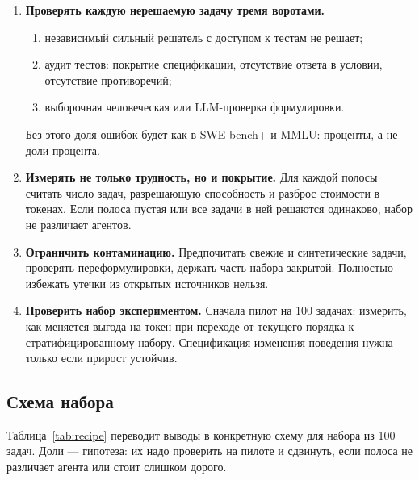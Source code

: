 \documentclass[11pt,a4paper]{article}
\begin{document}
\begin{enumerate}
\begin{itemize}
        \end{itemize}
        Первые три дают стабильную метку, четвёртая — обучающий сигнал, а
        не свойство задачи. Для оценки нужны первые три.
  \item \textbf{Проверять каждую нерешаемую задачу тремя воротами.}
        \begin{enumerate}
          \item независимый сильный решатель с доступом к тестам не решает;
          \item аудит тестов: покрытие спецификации, отсутствие ответа в
                условии, отсутствие противоречий;
          \item выборочная человеческая или LLM-проверка формулировки.
        \end{enumerate}
        Без этого доля ошибок будет как в SWE-bench+ и MMLU: проценты, а не
        доли процента.
  \item \textbf{Измерять не только трудность, но и покрытие.} Для каждой
        полосы считать число задач, разрешающую способность и разброс
        стоимости в токенах. Если полоса пустая или все задачи в ней
        решаются одинаково, набор не различает агентов.
  \item \textbf{Ограничить контаминацию.} Предпочитать свежие и
        синтетические задачи, проверять переформулировки, держать часть
        набора закрытой. Полностью избежать утечки из открытых источников
        нельзя.
  \item \textbf{Проверить набор экспериментом.} Сначала пилот на 100
        задачах: измерить, как меняется выгода на токен при переходе от
        текущего порядка к стратифицированному набору. Спецификация
        изменения поведения нужна только если прирост устойчив.
\end{enumerate}

\subsection{Схема набора}

Таблица~\ref{tab:recipe} переводит выводы в конкретную схему для набора из
100 задач. Доли — гипотеза: их надо проверить на пилоте и сдвинуть, если
полоса не различает агента или стоит слишком дорого.
\end{document}
